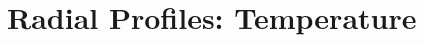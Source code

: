 \documentclass[MScProj_TLRH_ClusterEnergy.tex]{subfiles}
\begin{document}
% 
% 


\newpage

\section{Radial Profiles: Temperature}
\label{sec:ChandraTemperature}
\end{document}
